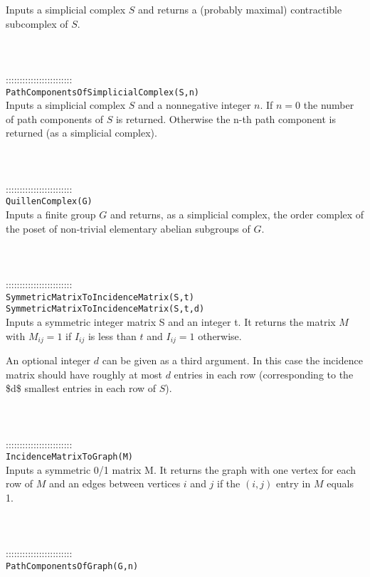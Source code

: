 \documentclass[a4paper,11pt]{report}
\begin{document}
{ Inputs a simplicial complex $S$ and returns a (probably maximal) contractible subcomplex of $S$. \\
 \\
 \\
 \\
 ::::::::::::::::::::::::\\
 \texttt{PathComponentsOfSimplicialComplex(S,n)}\\
 

 Inputs a simplicial complex $S$ and a nonnegative integer $n$. If $n=0$ the number of path components of $S$ is returned. Otherwise the n-th path component is returned (as a simplicial
complex). \\
 \\
 \\
 \\
 ::::::::::::::::::::::::\\
 \texttt{QuillenComplex(G)}\\
 

 Inputs a finite group $G$ and returns, as a simplicial complex, the order complex of the poset of
non-trivial elementary abelian subgroups of $G$. \\
 \\
 \\
 \\
 ::::::::::::::::::::::::\\
 \texttt{SymmetricMatrixToIncidenceMatrix(S,t)}\\
 \texttt{SymmetricMatrixToIncidenceMatrix(S,t,d)}\\
 

 Inputs a symmetric integer matrix S and an integer t. It returns the matrix $M$ with $M_{ij}=1$ if $I_{ij}$ is less than $ t$ and $I_{ij}=1$ otherwise. 

 An optional integer $d$ can be given as a third argument. In this case the incidence matrix should
have roughly at most $d$ entries in each row (corresponding to the \$d\$ smallest entries in each row
of $S$). \\
 \\
 \\
 \\
 ::::::::::::::::::::::::\\
 \texttt{IncidenceMatrixToGraph(M)}\\
 

 Inputs a symmetric 0/1 matrix M. It returns the graph with one vertex for each
row of $M$ and an edges between vertices $i$ and $j$ if the $(i,j)$ entry in $M$ equals 1. \\
 \\
 \\
 \\
 ::::::::::::::::::::::::\\
 \texttt{PathComponentsOfGraph(G,n)}\\
 

}
\end{document}
